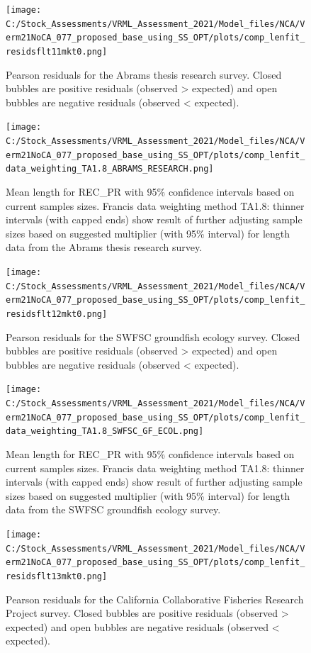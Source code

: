 \documentclass[11pt,
  english,
  a4paper,
]{article}
\begin{document}
\begin{figure}
\centering
\texttt{[image: C:/Stock\_Assessments/VRML\_Assessment\_2021/Model\_files/NCA/Verm21NoCA\_077\_proposed\_base\_using\_SS\_OPT/plots/comp\_lenfit\_residsflt11mkt0.png]}
\caption{Pearson residuals for the Abrams thesis research survey. Closed bubbles are positive residuals (observed \textgreater{} expected) and open bubbles are negative residuals (observed \textless{} expected).\label{fig:len-pearson-ABRAMS-RESEARCH}}
\end{figure}

\begin{figure}
\centering
\texttt{[image: C:/Stock\_Assessments/VRML\_Assessment\_2021/Model\_files/NCA/Verm21NoCA\_077\_proposed\_base\_using\_SS\_OPT/plots/comp\_lenfit\_data\_weighting\_TA1.8\_ABRAMS\_RESEARCH.png]}
\caption{Mean length for REC\_PR with 95\% confidence intervals based on current samples sizes. Francis data weighting method TA1.8: thinner intervals (with capped ends) show result of further adjusting sample sizes based on suggested multiplier (with 95\% interval) for length data from the Abrams thesis research survey.\label{fig:mean-len-fit-ABRAMS-RESEARCH}}
\end{figure}

\begin{figure}
\centering
\texttt{[image: C:/Stock\_Assessments/VRML\_Assessment\_2021/Model\_files/NCA/Verm21NoCA\_077\_proposed\_base\_using\_SS\_OPT/plots/comp\_lenfit\_residsflt12mkt0.png]}
\caption{Pearson residuals for the SWFSC groundfish ecology survey. Closed bubbles are positive residuals (observed \textgreater{} expected) and open bubbles are negative residuals (observed \textless{} expected).\label{fig:len-pearson-SWFSC-GF-ECOL}}
\end{figure}

\begin{figure}
\centering
\texttt{[image: C:/Stock\_Assessments/VRML\_Assessment\_2021/Model\_files/NCA/Verm21NoCA\_077\_proposed\_base\_using\_SS\_OPT/plots/comp\_lenfit\_data\_weighting\_TA1.8\_SWFSC\_GF\_ECOL.png]}
\caption{Mean length for REC\_PR with 95\% confidence intervals based on current samples sizes. Francis data weighting method TA1.8: thinner intervals (with capped ends) show result of further adjusting sample sizes based on suggested multiplier (with 95\% interval) for length data from the SWFSC groundfish ecology survey.\label{fig:mean-len-fit-SWFSC-GF-ECOL}}
\end{figure}

\begin{figure}
\centering
\texttt{[image: C:/Stock\_Assessments/VRML\_Assessment\_2021/Model\_files/NCA/Verm21NoCA\_077\_proposed\_base\_using\_SS\_OPT/plots/comp\_lenfit\_residsflt13mkt0.png]}
\caption{Pearson residuals for the California Collaborative Fisheries Research Project survey. Closed bubbles are positive residuals (observed \textgreater{} expected) and open bubbles are negative residuals (observed \textless{} expected).\label{fig:len-pearson-CCFRP}}
\end{figure}
\end{document}
